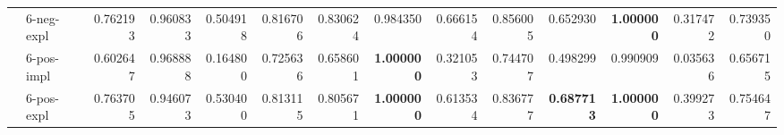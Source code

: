 \begin{tabular}{ll|rrrr|rrrr|rrrr}
 & 6-neg-expl & 0.762193 & 0.960833 & 0.504918 & 0.816706 & 0.830624 & 0.984350 & 0.666154 & 0.856005 & 0.652930 & \bfseries 1.000000 & 0.317472 & 0.739350 \\
 & 6-pos-impl & 0.602647 & 0.968888 & 0.164800 & 0.725636 & 0.658601 & \bfseries 1.000000 & 0.321053 & 0.744707 & 0.498299 & 0.990909 & 0.035636 & 0.656715 \\
 & 6-pos-expl & 0.763705 & 0.946073 & 0.530400 & 0.813115 & 0.805671 & \bfseries 1.000000 & 0.613534 & 0.836777 & \bfseries 0.687713 & \bfseries 1.000000 & 0.399273 & 0.754647 \\
\end{tabular}